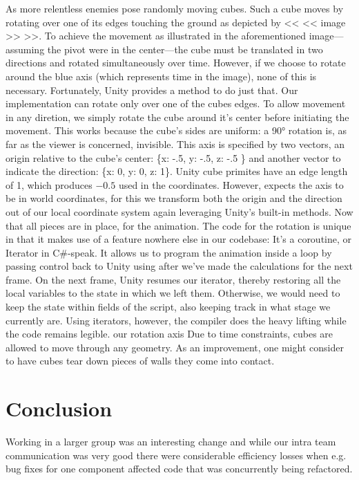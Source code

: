 \documentclass{report}
\begin{document}
As more relentless enemies pose randomly moving cubes. Such a cube moves by rotating over one of its edges touching the ground as depicted by << << image >> >>. To achieve the movement as illustrated in the aforementioned image---assuming the pivot were in the center---the cube must be translated in two directions and rotated simultaneously over time. However, if we choose to rotate around the blue axis (which represents time in the image), none of this is necessary. Fortunately, Unity provides a  method to do just that. Our implementation can rotate only over one of the cubes edges. To allow movement in any diretion, we simply rotate the cube around it's center before initiating the movement. This works because the cube's sides are uniform: a 90° rotation is, as far as the viewer is concerned, invisible. This axis is specified by two vectors, an origin relative to the cube's center: \{x: -.5, y: -.5, z: -.5 \} and another vector to indicate the direction: \{x: 0, y: 0, z: 1\}. Unity cube primites have an edge length of 1, which produces $-0.5$ used in the coordinates. However,  expects the axis to be in world coordinates, for this we transform both the origin and the direction out of our local coordinate system again leveraging Unity's built-in methods. Now that all pieces are in place, for the animation.
The code for the rotation is unique in that it makes use of a feature nowhere else in our codebase: It's a coroutine, or Iterator in C#-speak\cite{http://msdn.microsoft.com/en-us/library/dscyy5s0.aspx}. It allows us to program the animation inside a loop by passing control back to Unity using  after we've made the calculations for the next frame. On the next frame, Unity resumes our iterator, thereby restoring all the local variables to the state in which we left them. Otherwise, we would need to keep the state within fields of the script, also keeping track in what stage we currently are. Using iterators, however, the compiler does the heavy lifting while the code remains legible.
  our rotation axis Due to time constraints, cubes are allowed to move through any geometry. As an improvement, one might consider to have cubes tear down pieces of walls they come into contact.


\section{Conclusion}
 Working in a larger group was an interesting change and while our intra team communication was very good there were considerable efficiency losses when e.g. bug fixes for one component affected code that was concurrently being refactored.
\end{document}
